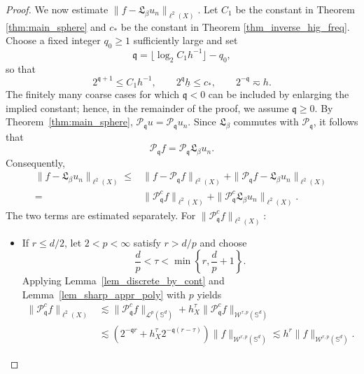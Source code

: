 \documentclass{article}
\numberwithin{equation}{section}
\def\SS{\mathbb{S}}
\def\pc{\mathcal{P}^c}
\def\mq{\mathfrak{q}}
\begin{document}
\begin{proof}
\medskip
We now estimate $\|f-\mathfrak L_\beta u_n\|_{\ell^2(X)}$. Let $C_1$ be the constant in Theorem \ref{thm:main_sphere} and $c_*$ be the constant in Theorem \ref{thm_inverse_hig_freq}. Choose a fixed integer $q_0\geq1$ sufficiently large and set
\begin{equation*}
    \mq=\lfloor\log_2C_1 h^{-1}\rfloor-q_0,
\end{equation*}
so that
\begin{equation*}
    2^{\mq+1}\leq C_1 h^{-1},\qquad 2^\mq\underline h\leq c_*,\qquad 2^{-\mq}\eqsim h.
\end{equation*}
The finitely many coarse cases for which $\mq<0$ can be included by enlarging the implied constant; hence, in the remainder of the proof, we assume $\mq\geq0$. By Theorem~\ref{thm:main_sphere}, $\mathcal P_\mq u=\mathcal P_\mq u_n$. Since $\mathfrak L_\beta$ commutes with $\mathcal P_\mq$, it follows that
\begin{equation*}
    \mathcal P_\mq f=\mathcal P_\mq\mathfrak L_\beta u_n.
\end{equation*}
Consequently,
\begin{equation}\label{eqn:error_decom3}
    \begin{split}
        \|f-\mathfrak L_\beta u_n\|_{\ell^2(X)}
        \leq&\|f-\mathcal P_\mq f\|_{\ell^2(X)}
        +\|\mathcal P_\mq f-\mathfrak L_\beta u_n\|_{\ell^2(X)}\\
        =&\|\pc_\mq f\|_{\ell^2(X)}
        +\|\pc_\mq\mathfrak L_\beta u_n\|_{\ell^2(X)}.
    \end{split}
\end{equation}
The two terms are estimated separately. For $\|\pc_\mq f\|_{\ell^2(X)}$:
\begin{itemize}
    \item If $r\leq d/2$, let $2<p<\infty$ satisfy $r>d/p$ and choose
\begin{equation*}
    \frac{d}{p}<\tau<\min\left\{r,\frac{d}{p}+1\right\}.
\end{equation*}
Applying Lemma~\ref{lem_discrete_by_cont} and Lemma~\ref{lem_sharp_appr_poly} with $p$ yields
\begin{equation*}
    \begin{split}
        \|\pc_\mq f\|_{\ell^2(X)}
        &\lesssim\|\pc_\mq f\|_{\mathcal L^p(\SS^d)}+h_X^\tau\|\pc_\mq f\|_{\mathcal W^{\tau,p}(\SS^d)}\\
        &\lesssim\left(2^{-\mq r}+h_X^\tau2^{-\mq(r-\tau)}\right)\|f\|_{\mathcal W^{r,p}(\SS^d)}
        \lesssim h^r\|f\|_{\mathcal W^{r,p}(\SS^d)}.

\end{split}
\end{equation*}
\end{itemize}
\end{proof}
\end{document}
